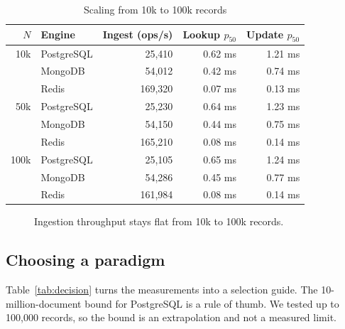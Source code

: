 \documentclass[conference,a4paper]{IEEEtran}
\begin{document}
\begin{table}[t]
\caption{Scaling from 10k to 100k records}
\label{tab:scale}
\centering
\footnotesize
\setlength{\tabcolsep}{4pt}
\begin{tabular}{@{}rlrrr@{}}
\toprule
$N$ & Engine & Ingest (ops/s) & Lookup $p_{50}$ & Update $p_{50}$ \\
\midrule
10k  & PostgreSQL & 25,410  & 0.62 ms & 1.21 ms \\
     & MongoDB    & 54,012  & 0.42 ms & 0.74 ms \\
     & Redis      & 169,320 & 0.07 ms & 0.13 ms \\
50k  & PostgreSQL & 25,230  & 0.64 ms & 1.23 ms \\
     & MongoDB    & 54,150  & 0.44 ms & 0.75 ms \\
     & Redis      & 165,210 & 0.08 ms & 0.14 ms \\
100k & PostgreSQL & 25,105  & 0.65 ms & 1.24 ms \\
     & MongoDB    & 54,286  & 0.45 ms & 0.77 ms \\
     & Redis      & 161,984 & 0.08 ms & 0.14 ms \\
\bottomrule
\end{tabular}
\end{table}

\begin{figure}[t]
\centering
{}
\caption{Ingestion throughput stays flat from 10k to 100k records.}
\label{fig:scale}
\end{figure}

\subsection{Choosing a paradigm}
Table~\ref{tab:decision} turns the measurements into a selection guide. The 10-million-document bound for PostgreSQL is a rule of thumb. We tested up to 100,000 records, so the bound is an extrapolation and not a measured limit.
\end{document}
